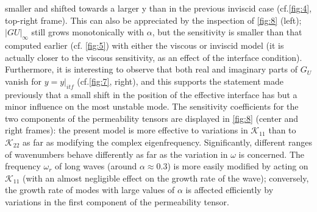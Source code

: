 smaller and shifted towards a larger y than in the previous inviscid case (cf.\ref{fig:4}, top-right frame).
This can also be appreciated by the inspection of \ref{fig:8} (left); $|G U |_{\infty}$ still grows monotonically with
$\alpha$, but the sensitivity is smaller than that computed earlier (cf. \ref{fig:5}) with either the viscous or
inviscid model (it is actually closer to the viscous sensitivity, as an effect of the interface condition).
Furthermore, it is interesting to observe that both real and imaginary parts of $G_U$ vanish for $y = y|_{itf}$
(cf.\ref{fig:7}, right), and this supports the statement made previously that a small shift in the position
of the effective interface has but a minor influence on the most unstable mode.
The sensitivity coefficients for the two components of the permeability tensors are displayed in
\ref{fig:8} (center and right frames): the present model is more effective to variations in $\mathcal{K}_{11}$ than to $\mathcal{K}_{22}$
as far as modifying the complex eigenfrequency. Significantly, different ranges of wavenumbers
behave differently as far as the variation in $\omega$ is concerned. The frequency $\omega_r$ of long waves (around
$\alpha \approx 0.3$) is more easily modified by acting on $\mathcal{K}_{11}$ (with an almost negligible effect on the growth
rate of the wave); conversely, the growth rate of modes with large values of $\alpha$ is affected efficiently
by variations in the first component of the permeability tensor.

